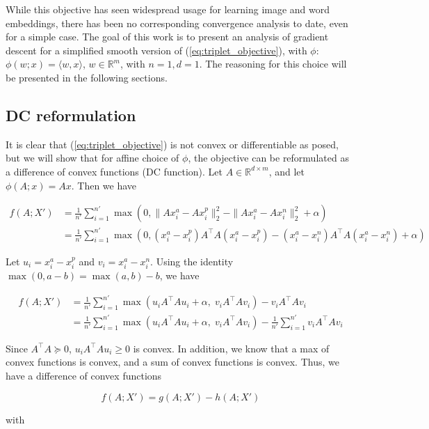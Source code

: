 \documentclass[11pt]{article}
\begin{document}
While this objective has seen widespread usage for learning image and word embeddings, there has been no corresponding convergence analysis to date, even for a simple case. The goal of this work is to present an analysis of gradient descent for a simplified smooth version of (\ref{eq:triplet_objective}), with $\phi$: $\phi(w; x) = \langle w, x \rangle$, $w \in \mathbb{R}^{m}$, with $n=1, d=1$. The reasoning for this choice will be presented in the following sections.

\subsection{DC reformulation}

It is clear that (\ref{eq:triplet_objective}) is not convex or differentiable as posed, but we will show that for affine choice of $\phi$, the objective can be reformulated as a difference of convex functions (DC function). Let $A \in \mathbb{R}^{d \times m}$, and let $\phi(A; x) = Ax$. Then we have

\begin{align*}
    f(A; X') &= \frac{1}{n'} \sum_{i=1}^{n'} \max(0, \| Ax_i^a - Ax_i^p\|_2^2 - \| Ax_i^a - Ax_i^n \|_2^2 + \alpha) \\
    &= \frac{1}{n'} \sum_{i=1}^{n'} \max(0, (x_i^a - x_i^p)A^{\top}A(x_i^a - x_i^p) - (x_i^a - x_i^n)A^{\top}A(x_i^a - x_i^n) + \alpha) 
\end{align*}

Let $u_i = x_i^a - x_i^p$ and $v_i = x_i^a - x_i^n$. Using the identity $\max(0, a - b) = \max(a, b) - b$, we have

\begin{align*}
    f(A; X') &= \frac{1}{n'} \sum_{i=1}^{n'} \max(u_i A^{\top}Au_i + \alpha, \; v_i A^{\top}A v_i) - v_i A^{\top}A v_i \\
    &= \frac{1}{n'} \sum_{i=1}^{n'} \max(u_i A^{\top}Au_i + \alpha, \; v_i A^{\top}A v_i) - \frac{1}{n'} \sum_{i=1}^{n'} v_i A^{\top}A v_i
\end{align*}

Since $A^{\top}A \succeq 0$, \; $u_i A^{\top}Au_i \geq 0$ is convex. In addition, we know that a max of convex functions is convex, and a sum of convex functions is convex. Thus, we have a difference of convex functions

\begin{equation}
    f(A; X') = g(A; X') - h(A; X')
\end{equation}

with
\end{document}
